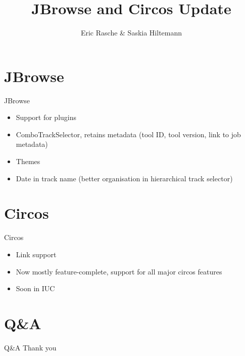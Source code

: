 \documentclass[12pt]{phage3slides} %
\title[JBrowse and Circos Update]{JBrowse and Circos Update}
\author[ER, SH]{Eric Rasche \& Saskia Hiltemann}
\begin{document}
\frame{\titlepage}


\section{JBrowse}
\begin{frame}{JBrowse}
	\begin{itemize}
		\item Support for plugins
		\item ComboTrackSelector, retains metadata (tool ID, tool version, link to job metadata)
		\item Themes
		\item Date in track name (better organisation in hierarchical track selector)
	\end{itemize}
\end{frame}



\section{Circos}
\begin{frame}{Circos}
	\begin{itemize}
		\item Link support
		\item Now mostly feature-complete, support for all major circos features
		\item Soon in IUC
	\end{itemize}
\end{frame}



\section{Q\&A}
\begin{frame}{Q\&A}
	Thank you \\\ \\
	\begin{center}
		\begin{tabular}{rl}
			\end{tabular}\\[1cm]
			\fundingNSFABIannotation
	\end{center}
\end{frame}
\end{document}
